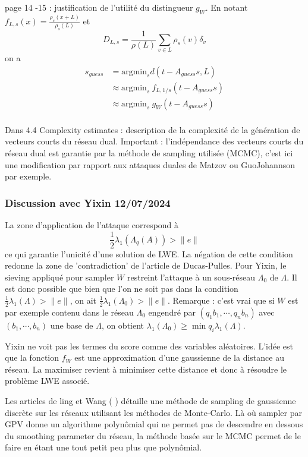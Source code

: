 \documentclass{article}
\begin{document}
page 14 -15 : justification de l'utilité du distingueur $g_W$. En notant $f_{L,s}(x) = \frac{\rho_s(x+L)}{\rho_s(L)}$ et 
$$D_{L , s}  =\frac{1}{\rho(L)}\sum_{v\in L} \rho_s (v)\delta_v$$ 
on a 
\[\begin{split}
s_{guess} & = \text{argmin}_s d(t - A_{guess} s , L ) \\
	& \approx \text{argmin}_s \  f_{L, 1/s}(t - A_{guess} s) \\
	& \approx \text{argmin}_s \ g_W(t - A_{guess} s ) \\
\end{split}\]

Dans 4.4 Complexity estimates : description de la complexité de la génération de vecteurs courts du réseau dual. Important : l'indépendance des vecteurs courts du réseau dual est garantie par la méthode de sampling utilisée (MCMC), c'est ici une modification par rapport aux attaques duales de Matzov ou GuoJohannson par exemple.

\subsubsection{Discussion avec Yixin 12/07/2024}

La zone d'application de l'attaque correspond à \[\frac{1}{2}\lambda_1(\Lambda_q(A)) > \|e\|\]
ce qui garantie l'unicité d'une solution de LWE. La négation de cette condition redonne la zone de 'contradiction' de l'article de Ducas-Pulles. Pour Yixin, le sieving appliqué pour sampler $W$ restreint l'attaque à un sous-réseau $\Lambda_0$ de $\Lambda$. Il est donc possible que bien que l'on ne soit pas dans la condition $\frac{1}{2}\lambda_1(\Lambda) > \|e\|$, on ait
$\frac{1}{2}\lambda_1(\Lambda_0) > \|e\|$. Remarque : c'est vrai que si $W$ est par exemple contenu dans le réseau $\Lambda_0$ engendré par $(q_1 b_1,\cdots , q_n b_n )$ avec $(b_1,\cdots , b_n )$ une base de $\Lambda$, on obtient $\lambda_1(\Lambda_0) \geq \min q_i \lambda_1(\Lambda)$.

Yixin ne voit pas les termes du score comme des variables aléatoires. L'idée est que la fonction $f_W$ est une approximation d'une gaussienne de la distance au réseau. La maximiser revient à minimiser cette distance et donc à résoudre le problème LWE associé.
 
Les articles de ling et Wang (\cite{wang2017geometric} \cite{wang2019lattice}) détaille une méthode de sampling de gaussienne discrète sur les réseaux utilisant les méthodes de Monte-Carlo. Là où sampler par GPV donne un algorithme polynômial qui ne permet pas de descendre en dessous du smoothing parameter du réseau, la méthode basée sur le MCMC permet de le faire en étant une tout petit peu plus que polynômial.
 
\end{document}
